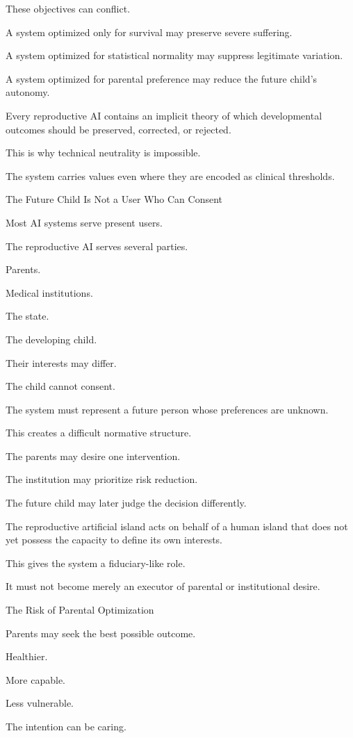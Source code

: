 These objectives can conflict.

A system optimized only for survival may preserve severe suffering.

A system optimized for statistical normality may suppress legitimate variation.

A system optimized for parental preference may reduce the future child’s autonomy.

Every reproductive AI contains an implicit theory of which developmental outcomes should be preserved, corrected, or rejected.

This is why technical neutrality is impossible.

The system carries values even where they are encoded as clinical thresholds.

The Future Child Is Not a User Who Can Consent

Most AI systems serve present users.

The reproductive AI serves several parties.

Parents.

Medical institutions.

The state.

The developing child.

Their interests may differ.

The child cannot consent.

The system must represent a future person whose preferences are unknown.

This creates a difficult normative structure.

The parents may desire one intervention.

The institution may prioritize risk reduction.

The future child may later judge the decision differently.

The reproductive artificial island acts on behalf of a human island that does not yet possess the capacity to define its own interests.

This gives the system a fiduciary-like role.

It must not become merely an executor of parental or institutional desire.

The Risk of Parental Optimization

Parents may seek the best possible outcome.

Healthier.

More capable.

Less vulnerable.

The intention can be caring.

